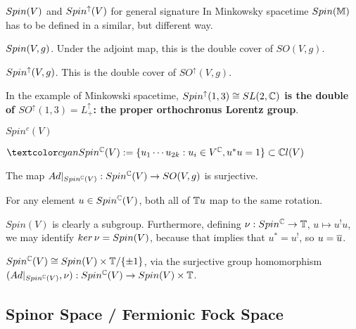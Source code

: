 \begin{frame}{$Spin(V)$ and $Spin^\uparrow(V)$ for general signature} %
    In Minkowsky spacetime $Spin(\mathbb M)$ has to be defined in a similar, but different way.
    
    \begin{definition}
    $Spin(V, g)$. Under the adjoint map, this is the double cover of $SO(V, g)$.
    \end{definition}
    
    \begin{definition}
    $Spin^\uparrow(V, g)$. This is the double cover of $SO^\uparrow(V, g)$.
    \end{definition}
    
    In the example of Minkowski spacetime, \textbf{$Spin^\uparrow(1, 3) \cong SL(2, \mathbb C)$ is the double of $SO^\uparrow(1, 3) = L^\uparrow_+$: the proper orthochronus Lorentz group}.
    
\end{frame}

\begin{frame}{$Spin^c(V)$} %

    \begin{Definition} $\defn{\spincv} := \set{u_1 \cdots u_{2k}: u_i \in V^\CC, u^*u = 1} \subset \cclv$
    \end{Definition}
    
    
    \begin{proposition}
    The map $Ad|_{Spin^\mathbb C(V)}: Spin^\mathbb C(V) \to SO(V, g)$ is surjective.
    
    For any element $u \in Spin^\mathbb C(V)$, both all of $\mathbb T u$ map to the same rotation.
    \end{proposition}
    
    $Spin(V)$ is clearly a subgroup. Furthermore,  defining $\nu: Spin^\mathbb C \to \mathbb T$, $u \mapsto u^! u$, we may identify $ker\,\nu = Spin(V)$, because that implies that $u^*= u^!$, so $u = \overline{u}$.
    
    $Spin^\mathbb C(V) \cong Spin(V) \times \mathbb T / \{\pm 1\}$, via the surjective group homomorphism $(Ad|_{Spin^\mathbb C(V)}, \nu): Spin^\mathbb C(V) \to Spin(V) \times \mathbb T$.
    
\end{frame}

\subsection{Spinor Space / Fermionic Fock Space}

